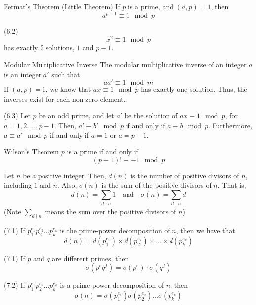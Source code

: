\documentclass[12pt]{article}
\begin{document}
\begin{theorem}{Fermat's Theorem (Little Theorem)}{}
    If $ p $ is a prime, and $ \left( a, p \right) = 1 $, then
    \[ a^{p-1} \equiv 1 \mod p \]
\end{theorem}
\begin{lemma}{(6.2)}{}
    \[ x^2 \equiv 1 \mod p \]
    has exactly 2 solutions, $ 1 $ and $ p - 1 $.
\end{lemma}
\begin{definition}{Modular Multiplicative Inverse}{}
    The modular multiplicative inverse of an integer $ a $ is an integer $ a' $ such that
    \[ a a' \equiv 1 \mod m \]
    If $ \left( a, p \right) = 1 $, we know that $ ax \equiv 1 \mod p $ has exactly one solution. Thus, the inverses exist for each non-zero element.
\end{definition}
\begin{lemma}{(6.3)}{}
    Let $ p $ be an odd prime, and let $ a' $ be the solution of $ ax \equiv 1 \mod p $, for $ a = 1, 2, \dots, p - 1 $. Then, $ a' \equiv b' \mod p $ if and only if $ a \equiv b \mod p $. Furthermore, $ a \equiv a' \mod p $ if and only if $ a = 1 $ or $ a = p - 1 $.
\end{lemma}
\begin{theorem}{Wilson's Theorem}{}
    $ p $ is a prime if and only if
    \[ \left( p - 1 \right)! \equiv -1 \mod p \]
\end{theorem}
\begin{definition}{}{}
    Let $ n $ be a positive integer. Then, $ d(n) $ is the number of positive divisors of $ n $, including $ 1 $ and $ n $. Also, $ \sigma (n) $ is the sum of the positive divisors of $ n $. That is,
    \[ d(n) = \sum_{d \mid n} 1 \quad \text{and} \quad \sigma (n) = \sum_{d \mid n} d \]
    (Note $ \sum_{d \mid n} $ means the sum over the positive divisors of $ n $)
\end{definition}
\begin{theorem}{(7.1)}{}
    If $ p_1^{e_1} p_2^{e_2} \dots p_k^{e_k} $ is the prime-power decomposition of $ n $, then we have that
    \[ d(n) = d \left( p_1^{e_1} \right) \times d \left( p_2^{e_2} \right) \times \dots \times d \left( p_k^{e_k} \right) \]
\end{theorem}
\begin{lemma}{(7.1)}{}
    If $ p $ and $ q $ are different primes, then
    \[ \sigma \left( p^e q^f \right) = \sigma \left( p^e \right) \cdot \sigma \left( q^f \right) \]
\end{lemma}
\begin{theorem}{(7.2)}{}
    If $ p_1^{e_1} p_2^{e_2} \dots p_k^{e_k} $ is a prime-power decomposition of $ n $, then
    \[ \sigma \left( n \right) = \sigma \left( p_1^{e_1} \right) \sigma \left( p_2^{e_2} \right) \dots \sigma \left( p_k^{e_k} \right) \]
\end{theorem}
\end{document}
